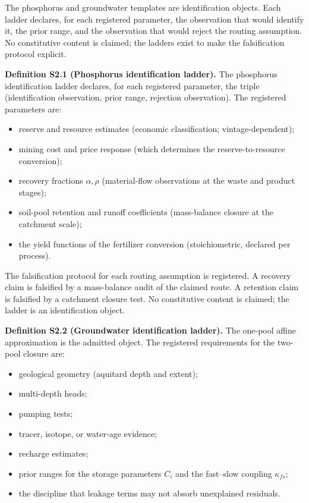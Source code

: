 \documentclass[11pt]{article}
\begin{document}
The phosphorus and groundwater templates are identification objects. Each ladder declares, for each registered parameter, the observation that would identify it, the prior range, and the observation that would reject the routing assumption. No constitutive content is claimed; the ladders exist to make the falsification protocol explicit.

\textbf{Definition S2.1 (Phosphorus identification ladder).} The phosphorus identification ladder declares, for each registered parameter, the triple (identification observation, prior range, rejection observation). The registered parameters are:

\begin{itemize}\setlength{\itemsep}{2pt}
\item reserve and resource estimates (economic classification; vintage-dependent);
\item mining cost and price response (which determines the reserve-to-resource conversion);
\item recovery fractions \(\alpha, \rho\) (material-flow observations at the waste and product stages);
\item soil-pool retention and runoff coefficients (mass-balance closure at the catchment scale);
\item the yield functions of the fertilizer conversion (stoichiometric, declared per process).
\end{itemize}

The falsification protocol for each routing assumption is registered. A recovery claim is falsified by a mass-balance audit of the claimed route. A retention claim is falsified by a catchment closure test. No constitutive content is claimed; the ladder is an identification object.

\textbf{Definition S2.2 (Groundwater identification ladder).} The one-pool affine approximation is the admitted object. The registered requirements for the two-pool closure are:

\begin{itemize}\setlength{\itemsep}{2pt}
\item geological geometry (aquitard depth and extent);
\item multi-depth heads;
\item pumping tests;
\item tracer, isotope, or water-age evidence;
\item recharge estimates;
\item prior ranges for the storage parameters \(C_i\) and the fast--slow coupling \(\kappa_{fs}\);
\item the discipline that leakage terms may not absorb unexplained residuals.
\end{itemize}
\end{document}
